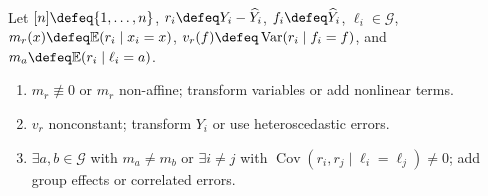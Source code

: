 \begin{example} \label{ex:regression-diagnostic-patterns-from-source} \\
Let $[n]\defeq\{1,\ldots,n\}$, $r_i\defeq Y_i-\widehat{Y}_i$, $f_i\defeq\widehat{Y}_i$, $\ell_i\in\mathcal{G}$,\\
$m_r(x)\defeq\mathbb{E}(r_i\mid x_i=x)$, $v_r(f)\defeq\operatorname{Var}(r_i\mid f_i=f)$, and $m_a\defeq\mathbb{E}(r_i\mid\ell_i=a)$.
\begin{enumerate}[label=(\roman*)]
\setlength{\itemsep}{0pt}
\item $m_r\not\equiv0$ or $m_r$ non-affine; transform variables or add nonlinear terms.
\item $v_r$ nonconstant; transform $Y_i$ or use heteroscedastic errors.
\item $\exists a,b\in\mathcal{G}$ with $m_a\neq m_b$ or $\exists i\neq j$ with $\operatorname{Cov}(r_i,r_j\mid\ell_i=\ell_j)\neq0$; add group effects or correlated errors.
\end{enumerate}
\end{example}

